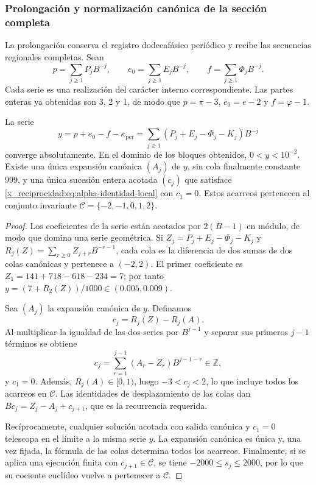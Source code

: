 \subsubsection{Prolongación y normalización canónica de la sección completa}
\label{x_reciprocidad:subsec:alpha-completa}

La prolongación conserva el registro dodecafásico periódico y recibe las secuencias
regionales completas. Sean
\[
 p=\sum_{j\geq1}P_jB^{-j},\qquad
 e_0=\sum_{j\geq1}E_jB^{-j},\qquad
 f=\sum_{j\geq1}\Phi_jB^{-j}.
\]
Cada serie es una realización del carácter interno correspondiente.
Las partes enteras ya obtenidas son 3, 2 y 1, de modo que
\(p=\pi-3\), \(e_0=e-2\) y
\(f=\varphi-1\).

\begin{proposition}
\label{x_reciprocidad:prop:alpha-normalizacion}
La serie
\begin{equation}
 y=p+e_0-f-\kappa_{\mathrm{per}}
   =\sum_{j\geq1}(P_j+E_j-\Phi_j-K_j)B^{-j}
 \label{x_reciprocidad:eq:alpha-serie}
\end{equation}
converge absolutamente. En el dominio de los bloques obtenidos,
\(0<y<10^{-2}\). Existe una única expansión canónica \((A_j)\) de
\(y\), sin cola finalmente constante 999, y una única sucesión entera
acotada \((c_j)\) que satisface \eqref{x_reciprocidad:eq:alpha-identidad-local} con
\(c_1=0\). Estos acarreos pertenecen al conjunto invariante
\(\mathcal C=\{-2,-1,0,1,2\}\).
\end{proposition}

\begin{proof}
Los coeficientes de la serie están acotados por \(2(B-1)\) en módulo,
de modo que domina una serie geométrica. Si
\(Z_j=P_j+E_j-\Phi_j-K_j\) y
\(R_j(Z)=\sum_{r\geq0}Z_{j+r}B^{-r-1}\), cada cola es la diferencia
de dos sumas de dos colas canónicas y pertenece a \((-2,2)\).
El primer coeficiente es
\(Z_1=141+718-618-234=7\); por tanto
\(y=(7+R_2(Z))/1000\in(0.005,0.009)\).

Sea \((A_j)\) la expansión canónica de \(y\). Definamos
\[
 c_j=R_j(Z)-R_j(A).
\]
Al multiplicar la igualdad de las dos series por \(B^{j-1}\) y separar
sus primeros \(j-1\) términos se obtiene
\[
 c_j=\sum_{r=1}^{j-1}(A_r-Z_r)B^{j-1-r}\in\mathbb Z,
\]
y \(c_1=0\). Además, \(R_j(A)\in[0,1)\), luego
\(-3<c_j<2\), lo que incluye todos los acarreos en \(\mathcal C\).
Las identidades de desplazamiento de las colas dan
\(Bc_j=Z_j-A_j+c_{j+1}\), que es la recurrencia requerida.

Recíprocamente, cualquier solución acotada con salida canónica y
\(c_1=0\) telescopa en el límite a la misma serie \(y\). La expansión
canónica es única y, una vez fijada, la fórmula de las colas determina
todos los acarreos. Finalmente, si se aplica una ejecución finita con
\(c_{j+1}\in\mathcal C\), se tiene \(-2000\leq s_j\leq2000\),
por lo que su cociente euclídeo vuelve a pertenecer a \(\mathcal C\).
\end{proof}

